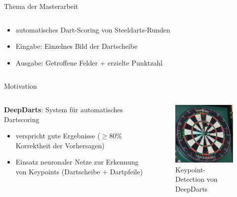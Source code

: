 \begin{frame}{Thema der Masterarbeit}
\begin{columns}
\begin{column}{0.6\linewidth}
            \begin{itemize}
                \item automatisches Dart-Scoring von Steeldarts-Runden
                \item Eingabe: Einzelnes Bild der Dartscheibe
                \item Ausgabe: Getroffene Felder + erzielte Punktzahl
            \end{itemize}

        \end{column}
    \end{columns}
\end{frame}

\begin{frame}{Motivation}

    \begin{columns}
        \begin{column}{0.6\linewidth}
            
            \textbf{DeepDarts}: System für automatisches Dartscoring
            \begin{itemize}
                \item verspricht gute Ergebnisse ($\ge 80\%$ Korrektheit der Vorhersagen)
                \item Einsatz neuronaler Netze zur Erkennung von Keypoints (Dartscheibe + Dartpfeile)
            \end{itemize}

        \end{column}
        \begin{column}{0.4\linewidth}
            
            \begin{figure}
                \centering
                \includegraphics[height=0.45\textheight]{imgs/dd_keypoints.pdf}
                \vspace*{-0.2cm}
                \caption{Keypoint-Detection von DeepDarts}
            \end{figure}


\end{column}
\end{columns}
\end{frame}

